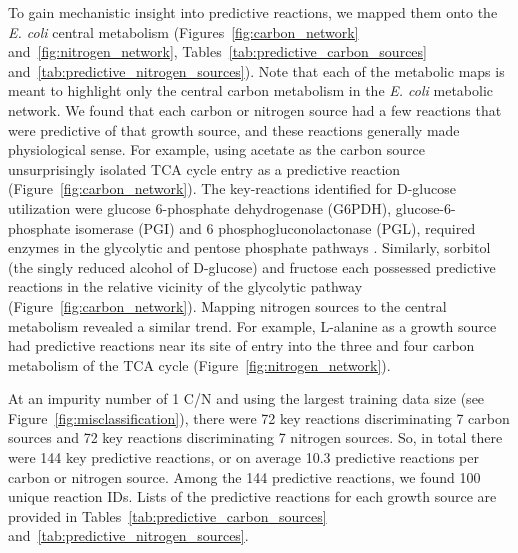 \documentclass[12pt]{article}
\begin{document}
To gain mechanistic insight into predictive reactions, we mapped them onto the \emph{E. coli} central metabolism (Figures~\ref{fig:carbon_network} and~\ref{fig:nitrogen_network}, Tables~\ref{tab:predictive_carbon_sources} and~\ref{tab:predictive_nitrogen_sources}). Note that each of the metabolic maps is meant to highlight only the central carbon metabolism in the \emph{E. coli} metabolic network. We found that each carbon or nitrogen source had a few reactions that were predictive of that growth source, and these reactions generally made physiological sense. For example, using acetate as the carbon source unsurprisingly isolated TCA cycle entry as a predictive reaction (Figure~\ref{fig:carbon_network}). The key-reactions identified for D-glucose utilization were glucose 6-phosphate dehydrogenase (G6PDH), glucose-6-phosphate isomerase (PGI) and 6 phosphogluconolactonase (PGL), required enzymes in the glycolytic and pentose phosphate pathways \cite{KuporFraenkel1972}. Similarly, sorbitol (the singly reduced alcohol of D-glucose) and fructose each possessed predictive reactions in the relative vicinity of the glycolytic pathway (Figure~\ref{fig:carbon_network}). Mapping nitrogen sources to the central metabolism revealed a similar trend. For example, L-alanine as a growth source had predictive reactions near its site of entry into the three and four carbon metabolism of the TCA cycle (Figure~\ref{fig:nitrogen_network}).

At an impurity number of 1 C/N and using the largest training data size (see Figure~\ref{fig:misclassification}), there were 72 key reactions discriminating 7 carbon sources and 72 key reactions discriminating 7 nitrogen sources. So, in total there were 144 key predictive reactions, or on average 10.3 predictive reactions per carbon or nitrogen source. Among the 144 predictive reactions, we found 100 unique reaction IDs. Lists of the predictive reactions for each growth source are provided in Tables~\ref{tab:predictive_carbon_sources} and~\ref{tab:predictive_nitrogen_sources}.
\end{document}
